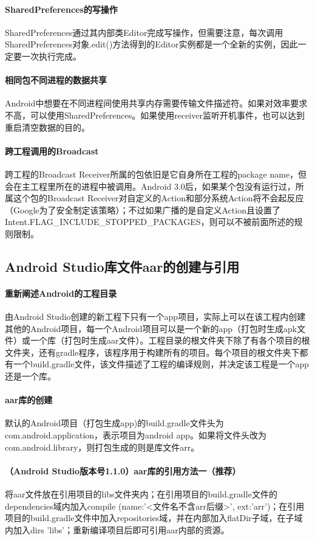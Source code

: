 \documentclass[UTF8]{ctexart}
\begin{document}
    \paragraph{SharedPreferences的写操作}
    SharedPreferences通过其内部类Editor完成写操作，但需要注意，每次调用SharedPreferences对象.edit()方法得到的Editor实例都是一个全新的实例，因此一定要一次执行完成。
    \paragraph{相同包不同进程的数据共享}
    Android中想要在不同进程间使用共享内存需要传输文件描述符。如果对效率要求不高，可以使用SharedPreferences。如果使用receiver监听开机事件，也可以达到重启清空数据的目的。
    \paragraph{跨工程调用的Broadcast}
    跨工程的Broadcast Receiver所属的包依旧是它自身所在工程的package name，但会在主工程里所在的进程中被调用。Android 3.0后，如果某个包没有运行过，所属这个包的Broadcast Receiver对自定义的Action和部分系统Action将不会起反应（Google为了安全制定该策略）；不过如果广播的是自定义Action且设置了Intent.FLAG_INCLUDE_STOPPED_PACKAGES，则可以不被前面所述的规则限制。
    \subsection{Android Studio库文件aar的创建与引用}
    \paragraph{重新阐述Android的工程目录}
    由Android Studio创建的新工程下只有一个app项目，实际上可以在该工程内创建其他的Android项目，每一个Android项目可以是一个新的app（打包时生成apk文件）或一个库（打包时生成aar文件）。工程目录的根文件夹下除了有各个项目的根文件夹，还有gradle程序，该程序用于构建所有的项目。每个项目的根文件夹下都有一个build.gradle文件，该文件描述了工程的编译规则，并决定该工程是一个app还是一个库。
    \paragraph{aar库的创建}
    默认的Android项目（打包生成app)的build.gradle文件头为com.android.application，表示项目为android app。如果将文件头改为com.android.library，则打包生成的则是库文件arr。
    \paragraph{（Android Studio版本号1.1.0）aar库的引用方法一（推荐）}
    将aar文件放在引用项目的libs文件夹内；在引用项目的build.gradle文件的dependencies域内加入compile (name:'<文件名不含arr后缀>', ext:'arr')；在引用项目的build.gradle文件中加入repositories域，并在内部加入flatDir子域，在子域内加入dirs 'libs'；重新编译项目后即可引用aar内部的资源。
\end{document}
